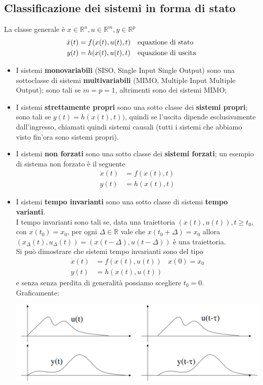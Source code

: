 \documentclass{article}
\numberwithin{equation}{subsection}
\let\oldsubsection\subsection%
\renewcommand{\subsection}{%
  \renewcommand{\theequation}{\thesubsection.\arabic{equation}}%
  \oldsubsection}%
\begin{document}
\subsection{Classificazione dei sistemi in forma di stato}
La classe generale è  $x \in \mathbb{R}^n , u \in \mathbb{R}^m , y\in \mathbb{R}^p$
\begin{align*}
    \dot x(t) &= f (x(t), u(t), t) & &\text{equazione di stato}\\
    y(t) &= h(x(t), u(t), t) & &\text{equazione di uscita}  
\end{align*}
\begin{itemize}
    \item I sistemi \textbf{monovariabili} (SISO, Single Input Single Output) sono una sottoclasse di sistemi \textbf{multivariabili} (MIMO, Multiple Input Multiple Output); sono tali se $m=p=1$, altrimenti sono dei sistemi MIMO;
    \item I sistemi \textbf{strettamente propri} sono una sotto classe dei \textbf{sistemi propri}; sono tali se $y(t) = h(x(t),t))$, quindi se l'uscita dipende esclusivamente dall'ingresso, chiamati quindi sistemi causali (tutti i sistemi che abbiamo visto fin'ora sono sistemi propri).
    \item I sistemi \textbf{non forzati} sono una sotto classe dei \textbf{sistemi forzati}; un esempio di sistema non forzato è il seguente
    \begin{align*}
        \dot x(t) &= f(x(t),t)\\
        y(t) &= h(x(t),t)
    \end{align*}
    \item I sistemi \textbf{tempo invarianti} sono una sotto classe di sistemi \textbf{tempo  varianti}.\\
    I tempo invarianti sono tali se, data una traiettoria $ (x(t), u(t)), t\geq t_0$, con $x(t_0)=x_0$, per ogni $\Delta \in \mathbb{R}$ vale che $x(t_0+\Delta)=x_0$ allora $(x_{\Delta} (t), u_{\Delta} (t)) = (x(t-\Delta), u(t-\Delta))$ è una traiettoria.\\
    Si può dimostrare che sistemi tempo invarianti sono del tipo
    \begin{align*}
        \dot x(t) &= f (x(t), u(t)) &x(0)=x_0\\
        y(t) &= h(x(t), u(t))
    \end{align*}
    e senza senza perdita di generalità possiamo scegliere $t_0=0$.\\
    Graficamente:
    \begin{center}
        \includegraphics[scale=0.3]{Images/Sistemi_tempo_invarianti.png}

\end{center}
\end{itemize}
\end{document}
